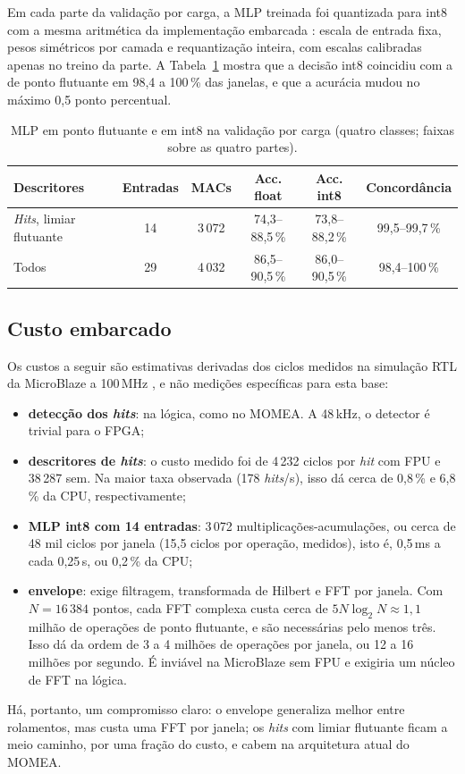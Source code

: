 \documentclass[12pt]{article}
\begin{document}
Em cada parte da validação por carga, a MLP treinada foi quantizada para int8 com a mesma aritmética da implementação embarcada \cite{simembarcado2026}: escala de entrada fixa, pesos simétricos por camada e requantização inteira, com escalas calibradas apenas no treino da parte. A Tabela~\ref{tab:int8} mostra que a decisão int8 coincidiu com a de ponto flutuante em 98,4 a 100\,\% das janelas, e que a acurácia mudou no máximo 0,5 ponto percentual.

\begin{table}[htbp]
	\centering
	\small
	\caption{MLP em ponto flutuante e em int8 na validação por carga (quatro classes; faixas sobre as quatro partes).}
	\label{tab:int8}
	\setlength{\tabcolsep}{4pt}
	\begin{tabular}{lccccc}
		\toprule
		\textbf{Descritores} & \textbf{Entradas} & \textbf{MACs} & \textbf{Acc. float} & \textbf{Acc. int8} & \textbf{Concordância} \\
		\midrule
		\textit{Hits}, limiar flutuante & 14 & 3\,072 & 74,3--88,5\,\% & 73,8--88,2\,\% & 99,5--99,7\,\% \\
		Todos & 29 & 4\,032 & 86,5--90,5\,\% & 86,0--90,5\,\% & 98,4--100\,\% \\
		\bottomrule
	\end{tabular}
\end{table}

\subsection{Custo embarcado}

Os custos a seguir são estimativas derivadas dos ciclos medidos na simulação RTL da MicroBlaze a 100\,MHz \cite{simembarcado2026}, e não medições específicas para esta base:
\begin{itemize}
	\item \textbf{detecção dos \textit{hits}}: na lógica, como no MOMEA. A 48\,kHz, o detector é trivial para o FPGA;
	\item \textbf{descritores de \textit{hits}}: o custo medido foi de 4\,232 ciclos por \textit{hit} com FPU e 38\,287 sem. Na maior taxa observada (178 \textit{hits}/s), isso dá cerca de 0,8\,\% e 6,8\,\% da CPU, respectivamente;
	\item \textbf{MLP int8 com 14 entradas}: 3\,072 multiplicações-acumulações, ou cerca de 48 mil ciclos por janela (15,5 ciclos por operação, medidos), isto é, 0,5\,ms a cada 0,25\,s, ou 0,2\,\% da CPU;
	\item \textbf{envelope}: exige filtragem, transformada de Hilbert e FFT por janela. Com \(N = 16\,384\) pontos, cada FFT complexa custa cerca de \(5N\log_2 N \approx 1{,}1\) milhão de operações de ponto flutuante, e são necessárias pelo menos três. Isso dá da ordem de 3 a 4 milhões de operações por janela, ou 12 a 16 milhões por segundo. É inviável na MicroBlaze sem FPU e exigiria um núcleo de FFT na lógica.
\end{itemize}
Há, portanto, um compromisso claro: o envelope generaliza melhor entre rolamentos, mas custa uma FFT por janela; os \textit{hits} com limiar flutuante ficam a meio caminho, por uma fração do custo, e cabem na arquitetura atual do MOMEA.
\end{document}

